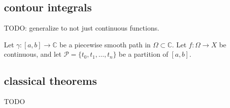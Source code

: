 \documentclass[12pt]{article}
\begin{document}
\begin{refsection}

\subsection{contour integrals} %

TODO: generalize to not just continuous functions.

Let $\gamma: [a,b] \to \mathbb{C}$ be a piecewise smooth path in $\Omega\subset\mathbb{C}$. Let $f:\Omega\to X$ be continuous, and let $\mathcal{P}=\{t_0, t_1, \dots, t_n\}$ be a partition of $[a,b]$.


\subsection{classical theorems} %

\begin{theorem}
	TODO
\end{theorem}


\nocite{banach_valued_functions_planet_math}
\nocite{pm_banach_convergent_series}
\nocite{se_spectral_radius_equals}
\printbibliography[heading=subbibliography]

\end{refsection}
\end{document}
